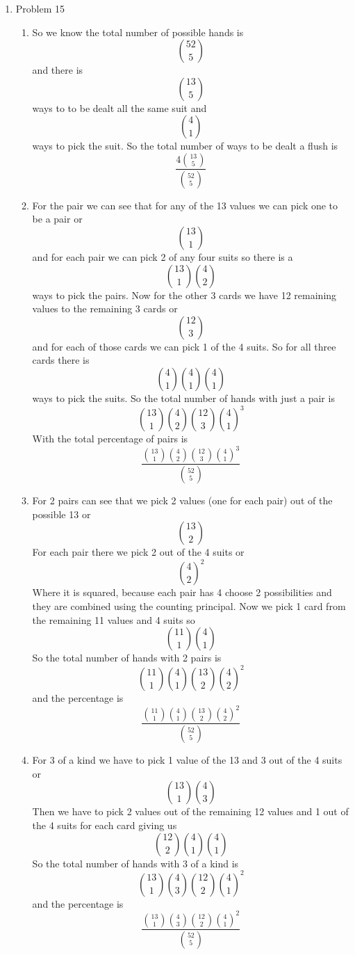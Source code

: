 \documentclass[11pt]{article}
\begin{document}
\begin{enumerate}
\item Problem 15
\begin{enumerate}
\item
So we know the total number of possible hands is $$52\choose{5}$$ and there is $$13\choose{5}$$ ways to to be dealt all the same suit and $$4\choose1$$ ways to pick the suit. So the total number of ways to be dealt a flush is 
$$\frac{4 {{13\choose5}}}{{52\choose5}}$$
\begin{center}
\end{center}

\item
For the pair we can see that for any of the 13 values we can pick one to be a pair or $$13\choose1$$ and for each pair we can pick 2 of any four suits so there is a $${13\choose1}{4\choose2}$$ ways to pick the pairs. Now for the other 3 cards we have 12 remaining values to the remaining 3 cards or $$12\choose3$$ and for each of those cards we can pick 1 of the 4 suits. So for all three cards there is $${4\choose1}{4\choose1}{4\choose1}$$ ways to pick the suits. So the total number of hands with just a pair is $${13\choose1}{4\choose2}{12\choose3}{4\choose1}^3$$
With the total percentage of pairs is
$$\frac{{13\choose1}{4\choose2}{12\choose3}{4\choose1}^3}{{52\choose5}}$$
\begin{center}
\end{center}

\item
For 2 pairs can see that we pick 2 values (one for each pair) out of the possible 13 or $$13\choose2$$ For each pair there we pick 2 out of the 4 suits or $${4\choose2}^2$$ Where it is squared, because each pair has 4 choose 2 possibilities and they are combined using the counting principal. Now we pick 1 card from the remaining 11 values and 4 suits so $${11\choose1}{4\choose1}$$
So the total number of hands with 2 pairs is
$${11\choose1}{4\choose1}{13\choose2}{4\choose2}^2$$
and the percentage is
$$\frac{{11\choose1}{4\choose1}{13\choose2}{4\choose2}^2}{{52\choose5}}$$
\begin{center}
\end{center}

\item
For 3 of a kind we have to pick 1 value of the 13 and 3 out of the 4 suits or 
$${13\choose1}{4\choose3}$$
Then we have to pick 2 values out of the remaining 12 values and 1 out of the 4 suits for each card giving us
$${12\choose2}{4\choose1}{4\choose1}$$
So the total number of hands with 3 of a kind is 
$${13\choose1}{4\choose3}{12\choose2}{4\choose1}^2$$
and the percentage is
$$\frac{{13\choose1}{4\choose3}{12\choose2}{4\choose1}^2}{{52\choose5}}$$
\begin{center}
\end{center}


\end{enumerate}
\end{enumerate}
\end{document}
